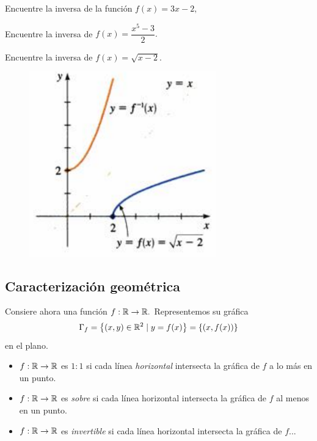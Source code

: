 \begin{exmp}
Encuentre la inversa de la funci\'on $f(x)=3x-2,$
\end{exmp}




\begin{exmp}
Encuentre la inversa de $f(x)=\dfrac{x^{5}-3}{2}.$
\end{exmp}




\begin{exmp}
Encuentre la inversa de $f(x)=\sqrt{x-2}.$
\end{exmp}




\begin{figure}[h!]
\centering
\includegraphics[height=8cm,keepaspectratio=true]{./md/MD02_sqrt_x-2.png}
\label{fig:MD02_sqrt_x-2}
\end{figure}


%
\subsection{Caracterizaci\'on geom\'etrica}


Consiere ahora una funci\'on $f:\mathbb{R} \to \mathbb{R}.$ Representemos su gr\'afica 
$$
\Gamma_{f}=\left\{ (x,y)\in\mathbb{R}^{2}\mid y=f(x) \right\}
=\left\{ (x,f(x)) \right\}
$$
en el plano.




\begin{rem}
\begin{itemize}
\item $f:\mathbb{R} \to \mathbb{R}$ es \emph{$1:1$} si cada l\'inea \emph{horizontal} intersecta la gr\'afica de $f$ a lo m\'as en un punto.
\item $f:\mathbb{R} \to \mathbb{R}$ es \emph{sobre} si cada l\'inea horizontal intersecta la gr\'afica de $f$ al menos en un punto.
\item $f:\mathbb{R} \to \mathbb{R}$ es \emph{invertible} si cada l\'inea horizontal intersecta la gr\'afica de $f$...
\end{itemize}

\end{rem}



